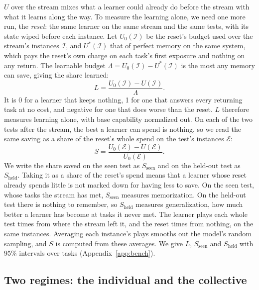 $U$ over the stream mixes what a learner could already do before the stream with what it learns along the way. To measure the learning alone, we need one more run, the \emph{reset}: the same learner on the same stream and the same tests, with its state wiped before each instance. Let $U_{0}(\mathcal{I})$ be the reset's budget used over the stream's instances $\mathcal{I}$, and $U^{*}(\mathcal{I})$ that of perfect memory on the same system, which pays the reset's own charge on each task's first exposure and nothing on any return. The learnable budget $\Lambda = U_{0}(\mathcal{I}) - U^{*}(\mathcal{I})$ is the most any memory can save, giving the share learned:
\begin{equation}
L = \frac{U_{0}(\mathcal{I}) - U(\mathcal{I})}{\Lambda}.
\label{eq:learned}
\end{equation}
It is 0 for a learner that keeps nothing, 1 for one that answers every returning task at no cost, and negative for one that does worse than the reset. $L$ therefore measures learning alone, with base capability normalized out. On each of the two tests after the stream, the best a learner can spend is nothing, so we read the same saving as a share of the reset's whole spend on the test's instances $\mathcal{E}$:
\begin{equation}
S = \frac{U_{0}(\mathcal{E}) - U(\mathcal{E})}{U_{0}(\mathcal{E})}.
\label{eq:transfer}
\end{equation}
We write the share saved on the seen test as $S_{\mathrm{seen}}$ and on the held-out test as $S_{\mathrm{held}}$. Taking it as a share of the reset's spend means that a learner whose reset already spends little is not marked down for having less to save. On the seen test, whose tasks the stream has met, $S_{\mathrm{seen}}$ measures memorization. On the held-out test there is nothing to remember, so $S_{\mathrm{held}}$ measures generalization, how much better a learner has become at tasks it never met. The learner plays each whole test \testPlays{} times from where the stream left it, and the reset \testPlays{} times from nothing, on the same instances. Averaging each instance's \testPlays{} plays smooths out the model's random sampling, and $S$ is computed from these averages. We give $L$, $S_{\mathrm{seen}}$ and $S_{\mathrm{held}}$ with 95\% intervals over tasks (Appendix~\ref{app:bench}).

\subsection{Two regimes: the individual and the collective}
\label{sec:regimes}

